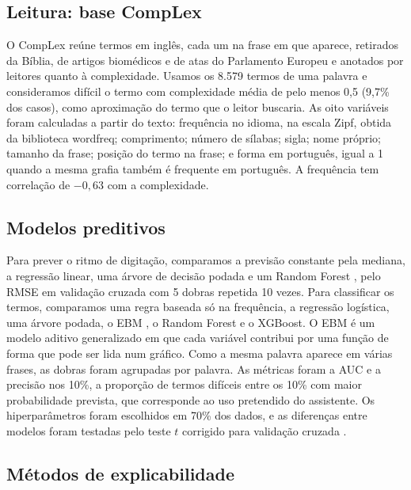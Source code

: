 \documentclass[12pt,a4paper]{article}
\begin{document}
\subsection{Leitura: base CompLex}

O CompLex \citep{shardlow2020} reúne termos em inglês, cada um na frase em que
aparece, retirados da Bíblia, de artigos biomédicos e de atas
do Parlamento Europeu e anotados por leitores quanto à complexidade. Usamos os
8.579 termos de uma palavra e consideramos difícil o termo com complexidade
média de pelo menos 0,5 (9,7\% dos casos), como aproximação do termo que o
leitor buscaria. As oito variáveis foram calculadas a partir do texto:
frequência no idioma, na escala Zipf, obtida da biblioteca wordfreq; comprimento; número de sílabas; sigla; nome próprio; tamanho
da frase; posição do termo na frase; e forma em português, igual a 1 quando a
mesma grafia também é frequente em português. A frequência tem correlação de
$-0,63$ com a complexidade.

\subsection{Modelos preditivos}

Para prever o ritmo de digitação, comparamos a previsão constante pela mediana, a
regressão linear, uma árvore de decisão podada e um Random Forest
\citep{breiman2001}, pelo RMSE em validação cruzada com 5 dobras repetida 10
vezes. Para classificar os termos, comparamos uma regra baseada só na
frequência, a regressão logística, uma árvore podada, o EBM
\citep{lou2013}, o Random Forest e o XGBoost. O EBM é
um modelo aditivo generalizado em que cada variável contribui por uma função de
forma que pode ser lida num gráfico. Como a mesma palavra aparece em várias
frases, as dobras foram agrupadas por palavra. As métricas foram a AUC e a
precisão nos 10\%, a proporção de termos difíceis entre os 10\% com maior
probabilidade prevista, que corresponde ao uso pretendido do assistente. Os
hiperparâmetros foram escolhidos em 70\% dos dados, e as diferenças entre
modelos foram testadas pelo teste $t$ corrigido para validação cruzada
\citep{nadeau2003}.

\subsection{Métodos de explicabilidade}
\end{document}

